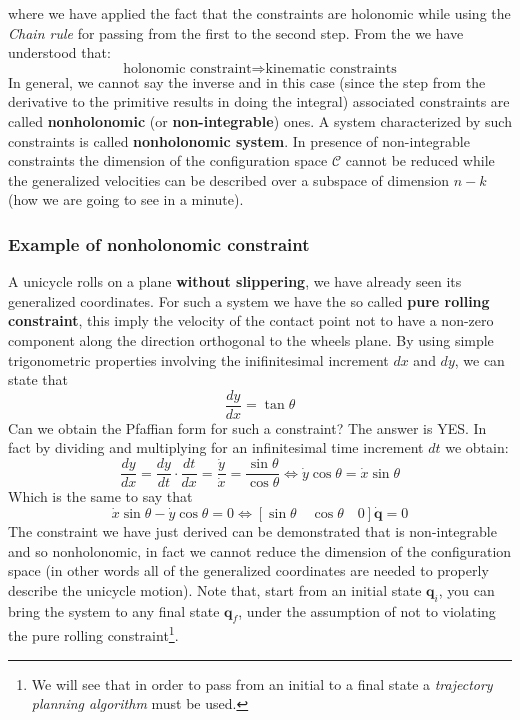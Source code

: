 where we have applied the fact that the constraints are holonomic while using the \textit{Chain rule} for passing from the first to the second step. From the  we have understood that: 
\begin{equation*}
    \text{holonomic constraint} \Longrightarrow 
    \text{kinematic constraints}
\end{equation*} 
In general, we cannot say the inverse and in this case (since the step from the derivative to the primitive results in doing the integral) associated constraints are called \textbf{nonholonomic} (or \textbf{non-integrable}) ones. A system characterized by such constraints is called \textbf{nonholonomic system}. In presence of non-integrable constraints the dimension of the configuration space $\mathcal{C}$ cannot be reduced while the generalized velocities can be described over a subspace of dimension $n-k$ (how we are going to see in a minute).

\subsubsection{Example of nonholonomic constraint}
A unicycle rolls on a plane \textbf{without slippering}, we have already seen its generalized coordinates. For such a system we have the so called \textbf{pure rolling constraint}, this imply the velocity of the contact point not to have a non-zero component along the direction orthogonal to the wheels plane. By using simple trigonometric properties involving the inifinitesimal increment $dx$ and $dy$, we can state that
\begin{equation}
    \frac{dy}{dx}=\tan{\theta}
\end{equation}
Can we obtain the Pfaffian form for such a constraint? The answer is YES. In fact by dividing and multiplying for an infinitesimal time increment $dt$ we obtain:
\begin{equation*}
    \frac{dy}{dx}=\frac{dy}{dt}\cdot
    \frac{dt}{dx}=\frac{\dot{y}}{\dot{x}}=\frac{\sin\theta}{\cos{\theta}} \iff 
    \dot{y}\cos{\theta}=\dot{x}\sin{\theta}
\end{equation*}
Which is the same to say that
\begin{equation}
    \dot{x}\sin\theta-\dot{y}\cos{\theta}=0 \iff 
    [\sin\theta \quad \cos\theta \quad 0] \dot{\mathbf{q}}=0
\end{equation}
The constraint we have just derived can be demonstrated that is non-integrable and so nonholonomic, in fact we cannot reduce the dimension of the configuration space (in other words all of the generalized coordinates are needed to properly describe the unicycle motion). Note that, start from an initial state $\mathbf{q}_i$, you can bring the system to any final state $\mathbf{q}_f$, under the assumption of not to violating the pure rolling constraint\footnote{
    We will see that in order to pass from an initial to a final state a \textit{trajectory planning algorithm} must be used.
}.

